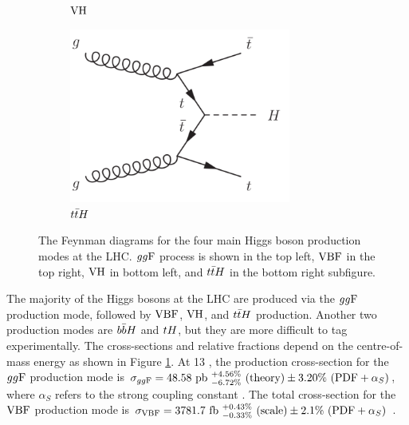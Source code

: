 \begin{figure}[h]
\begin{subfigure}[b]{0.5\textwidth}
    \caption{$\text{VH}$}
  \end{subfigure}%
  \begin{subfigure}[b]{0.5\textwidth}
    \centering
    \includegraphics[width=0.8\textwidth]{figures/theory/ttH}
    \caption{$t\bar{t} H$}
  \end{subfigure}
  \caption[Four main Higgs boson production modes at the LHC]
  {The Feynman diagrams for the four main Higgs boson production modes at the LHC.
  $gg\text{F}$ process is shown in the top left, $\text{VBF}$ in the top right, $\text{VH}$ in bottom left, and
  $t\bar{t} H$ in the bottom right subfigure.}
   \label{fig:the:prod}
\end{figure}

The majority of the Higgs bosons at the LHC are produced via the $gg\text{F}$ production mode,
followed by $\text{VBF}$, $\text{VH}$, and $t\bar{t} H$ production. Another two production modes are $b\bar{b} H$
and $tH$, but they are more difficult to tag experimentally. The cross-sections and
relative fractions depend on the centre-of-mass energy as shown in Figure \ref{fig:the:prod}.
At 13 \TeV, the production cross-section for the $gg\text{F}$ production mode is
$\sigma_{gg\text{F}} = 48.58~\text{pb}
~^{+4.56\%}_{-6.72\%}~(\text{theory})
\pm 3.20\%~(\text{PDF}+\alpha_S)$,
where $\alpha_S$ refers to the strong
coupling constant \cite{deFlorian:2016spz}. The total cross-section for the $\text{VBF}$ production mode is
$\sigma_{\text{VBF}} = 3781.7~\text{fb}
~^{+0.43\%}_{-0.33\%}~(\text{scale})
\pm 2.1\%~(\text{PDF}+\alpha_S) $ \cite{deFlorian:2016spz}.

